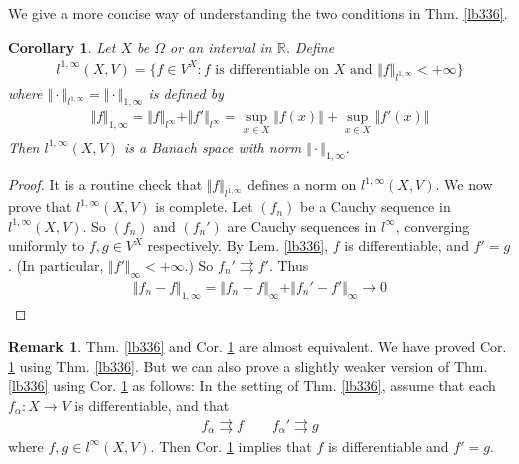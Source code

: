 \documentclass[12pt,b5paper,notitlepage]{article}
\theoremstyle{definition}
\newtheorem{rem}[df]{Remark}
\theoremstyle{plain}
\newtheorem{co}[df]{Corollary}
\newcommand{\Rbb}{\mathbb R}
\numberwithin{equation}{section}
\begin{document}
We give a more concise way of understanding the two conditions in Thm. \ref{lb336}.


\begin{co}\label{lb344}
Let $X$ be $\Omega$ or an interval in $\Rbb$. Define 
\begin{align*}
l^{1,\infty}(X,V)=\{f\in V^X: f\text{ is differentiable on }X\text{ and }\Vert f\Vert_{l^{1,\infty}}<+\infty\}
\end{align*}
where $\Vert \cdot\Vert_{l^{1,\infty}}=\Vert\cdot\Vert_{1,\infty}$ is defined by 
\begin{align*}
\Vert f\Vert_{1,\infty}=\Vert f\Vert_{l^\infty}+\Vert f'\Vert_{l^\infty}=\sup_{x\in X}\Vert f(x)\Vert+\sup_{x\in X}\Vert f'(x)\Vert
\end{align*}
Then $l^{1,\infty}(X,V)$ is a Banach space with norm $\Vert\cdot\Vert_{1,\infty}.$
\end{co}


\begin{proof}
It is a routine check that $\Vert f\Vert_{l^{1,\infty}}$ defines a norm on ${l^{1,\infty}}(X,V)$. We now prove that ${l^{1,\infty}}(X,V)$ is complete. Let $(f_n)$ be a Cauchy sequence in ${l^{1,\infty}}(X,V)$. So $(f_n)$ and $(f_n')$ are Cauchy sequences in $l^\infty$, converging uniformly to $f,g\in V^X$ respectively. By Lem. \ref{lb336}, $f$ is differentiable, and $f'=g$. (In particular, $\Vert f'\Vert_\infty<+\infty$.) So $f_n'\rightrightarrows f'$. Thus
\begin{align*}
\Vert f_n-f\Vert_{1,\infty}=\Vert f_n-f\Vert_\infty+\Vert f_n'-f'\Vert_\infty\rightarrow 0
\end{align*} 
\end{proof}


\begin{rem}
Thm. \ref{lb336} and Cor. \ref{lb344} are almost equivalent. We have proved Cor. \ref{lb344} using Thm. \ref{lb336}. But we can also prove a slightly weaker version of Thm. \ref{lb336} using Cor. \ref{lb344} as follows: In the setting of Thm. \ref{lb336}, assume that each $f_\alpha:X\rightarrow V$ is differentiable, and that 
\begin{align}\label{eq128}
f_\alpha\rightrightarrows f\qquad f_\alpha'\rightrightarrows g
\end{align}
where $f,g\in l^\infty(X,V)$. Then  Cor. \ref{lb344} implies that $f$ is differentiable and $f'=g$. 
\end{rem}
\end{document}
